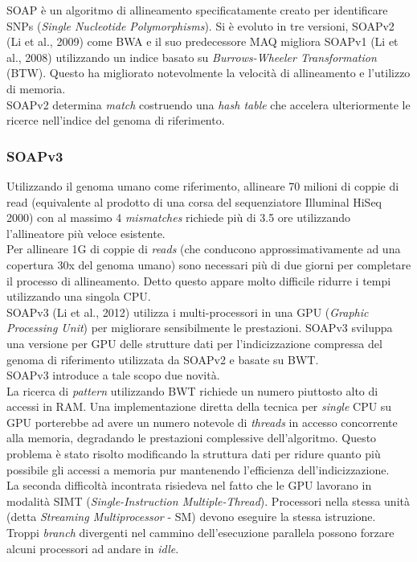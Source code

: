 \documentclass[conference]{IEEEtran}
\begin{document}
SOAP è un algoritmo di allineamento specificatamente creato per identificare SNPs (\textit{Single Nucleotide Polymorphisms}).
Si è evoluto in tre versioni, SOAPv2 (Li et al., 2009) come BWA e il suo predecessore MAQ migliora SOAPv1 (Li et al., 2008) utilizzando un indice basato su \textit{Burrows-Wheeler Transformation} (BTW). Questo ha migliorato notevolmente la velocità di allineamento e l'utilizzo di memoria.\\
SOAPv2 determina \textit{match} costruendo una \textit{hash table} che accelera ulteriormente le ricerce nell'indice del genoma di riferimento.\\
	\subsubsection{SOAPv3}

	Utilizzando il genoma umano come riferimento, allineare 70 milioni di coppie di read (equivalente al prodotto di una corsa del sequenziatore Illuminal HiSeq 2000) con al massimo 4 \textit{mismatches} richiede più di 3.5 ore utilizzando l'allineatore più veloce esistente.\\
Per allineare 1G di coppie di \textit{reads} (che conducono approssimativamente ad una copertura 30x del genoma umano) sono necessari più di due giorni per completare il processo di allineamento. Detto questo appare molto difficile ridurre i tempi utilizzando una singola CPU.\\

SOAPv3 (Li et al., 2012) utilizza i multi-processori in una GPU (\textit{Graphic Processing Unit}) per migliorare sensibilmente le prestazioni. SOAPv3 sviluppa una versione per GPU delle strutture dati per l'indicizzazione compressa del genoma di riferimento utilizzata da SOAPv2 e basate su BWT.\\
SOAPv3 introduce a tale scopo due novità.\\

La ricerca di \textit{pattern} utilizzando BWT richiede un numero piuttosto alto di accessi in RAM. Una implementazione diretta della tecnica per \textit{single} CPU su GPU porterebbe ad avere un numero notevole di \textit{threads} in accesso concorrente alla memoria, degradando le prestazioni complessive dell'algoritmo. Questo problema è stato risolto modificando la struttura dati per ridure quanto più possibile gli accessi a memoria pur mantenendo l'efficienza dell'indicizzazione.\\

La seconda difficoltà incontrata risiedeva nel fatto che le GPU lavorano in modalità SIMT (\textit{Single-Instruction Multiple-Thread}). Processori nella stessa unità (detta \textit{Streaming Multiprocessor} - SM) devono eseguire la stessa istruzione. Troppi \textit{branch} divergenti nel cammino dell'esecuzione parallela possono forzare alcuni processori ad andare in \textit{idle}.
\end{document}
